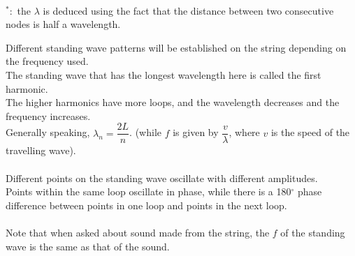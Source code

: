 \begin{center}
\\
$^*:$ the $\lambda$ is deduced using the fact that the distance between two consecutive nodes is half a wavelength.
\end{center}
Different standing wave patterns will be
established on the string depending on the frequency used. \\
The standing wave that has the longest wavelength here is called the first harmonic.\\
The higher harmonics have more loops, and the wavelength decreases and the frequency increases.\\
Generally speaking, $\lambda_n=\dfrac{2L}{n}$. (while $f$ is given by $\dfrac{v}{\lambda}$, where $v$ is the speed of the travelling wave).\\\\
Different points on the standing wave oscillate with different amplitudes. \\
Points within the same loop oscillate in phase, while there is a 180$^\circ$ phase difference between points in one loop and points in the next loop.\\\\
Note that when asked about sound made from the string, the $f$ of the standing wave is the same as that of the sound.

